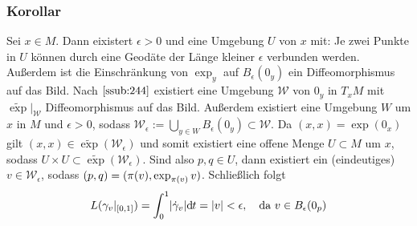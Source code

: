 \subsubsection{Korollar}
\label{ssub:246}
Sei $x\in M$. Dann eixistert $\epsilon>0$ und eine Umgebung $U$ von $x$ mit: Je zwei Punkte in $U$ können durch eine Geodäte der Länge kleiner $\epsilon$ verbunden werden. Außerdem ist die Einschränkung von $\exp_y$ auf $B_\epsilon (0_y)$ ein Diffeomorphismus auf das Bild.
Nach $\ref{ssub:244}$ existiert eine Umgebung $\mathcal{W}$ von $0_y$ in $T_x M$ mit $\widetilde{\exp}\vert_\mathcal{W}$ Diffeomorphismus auf das Bild. Außerdem existiert eine Umgebung $W$ um $x$ in $M$ und $\epsilon>0$, sodass $\mathcal{W}_\epsilon := \bigcup_{y\in W} B_\epsilon(0_y) \subset \mathcal{W}$. Da $(x,x) = \exp(0_x)$ gilt $(x,x) \in \widetilde{\exp}(\mathcal{W}_\epsilon)$ und somit existiert eine offene Menge $U\subset M$ um $x$, sodass $U\times U\subset \widetilde{\exp}(\mathcal{W}_\epsilon)$. Sind also $p,q\in U$, dann existiert ein (eindeutiges) $v\in \mathcal{W_\epsilon}$, sodass $(p,q) = (\pi(v), \exp_{\pi(v)} v)$.
Schließlich folgt
\[
L(\gamma_v \vert_{[0,1]}) = \int_0^1 \lvert\dot{\gamma}_v\rvert\mathrm{d}\mkern-1.0mu t = \lvert v\rvert < \epsilon,\quad \text{da}\ v\in B_\epsilon (0_p)
\]

